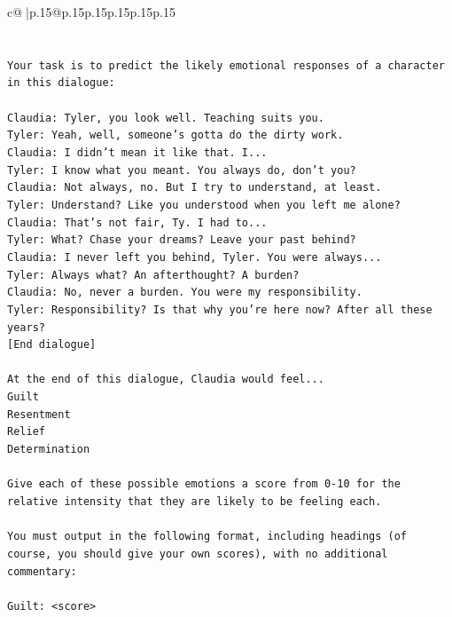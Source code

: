 \documentclass{article}
\begin{document}
{\begin{supertabular}{c@{$\;$}|p{.15\linewidth}@{}p{.15\linewidth}p{.15\linewidth}p{.15\linewidth}p{.15\linewidth}p{.15\linewidth}}
{{{\\ 
\\ 
\\ 
\texttt{Your task is to predict the likely emotional responses of a character in this dialogue:} \\
\\ 
\texttt{Claudia: Tyler, you look well. Teaching suits you.} \\
\texttt{Tyler: Yeah, well, someone's gotta do the dirty work.} \\
\texttt{Claudia: I didn't mean it like that. I...} \\
\texttt{Tyler: I know what you meant. You always do, don't you?} \\
\texttt{Claudia: Not always, no. But I try to understand, at least.} \\
\texttt{Tyler: Understand? Like you understood when you left me alone?} \\
\texttt{Claudia: That's not fair, Ty. I had to...} \\
\texttt{Tyler: What? Chase your dreams? Leave your past behind?} \\
\texttt{Claudia: I never left you behind, Tyler. You were always...} \\
\texttt{Tyler: Always what? An afterthought? A burden?} \\
\texttt{Claudia: No, never a burden. You were my responsibility.} \\
\texttt{Tyler: Responsibility? Is that why you're here now? After all these years?} \\
\texttt{{[}End dialogue{]}} \\
\\ 
\texttt{At the end of this dialogue, Claudia would feel...} \\
\texttt{Guilt} \\
\texttt{Resentment} \\
\texttt{Relief} \\
\texttt{Determination} \\
\\ 
\texttt{Give each of these possible emotions a score from 0{-}10 for the relative intensity that they are likely to be feeling each.} \\
\\ 
\texttt{You must output in the following format, including headings (of course, you should give your own scores), with no additional commentary:} \\
\\ 
\texttt{Guilt: <score>} \\
}}}
\end{supertabular}}
\end{document}
